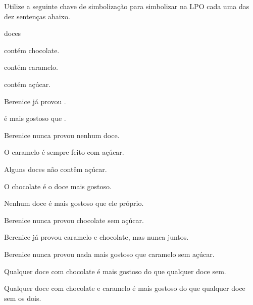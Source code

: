 \problempart
\label{pr.QLcandies}
Utilize a seguinte chave de simbolização para simbolizar na LPO cada uma das dez sentenças abaixo.
\begin{center}
\begin{ekey}
\item[\text{domínio}] doces
\item[\atom{C}{x}]  contém chocolate.
\item[\atom{M}{x}]  contém caramelo.
\item[\atom{A}{x}]  contém açúcar.
\item[\atom{B}{x}] Berenice já provou .
\item[\atom{G}{x,y}]  é mais gostoso que .
\end{ekey}
\end{center}
\begin{earg}
\item Berenice nunca provou nenhum doce.
\item O caramelo é sempre feito com açúcar.
\item Alguns doces não contêm açúcar.
\item O chocolate é o doce mais gostoso.
\item Nenhum doce é mais gostoso que ele próprio.
\item Berenice nunca provou chocolate sem açúcar.
\item Berenice já provou caramelo e chocolate, mas nunca juntos.
\item Berenice nunca provou nada mais gostoso que caramelo sem açúcar.
\item Qualquer doce com chocolate é mais gostoso do que qualquer doce sem.
\item Qualquer doce com chocolate e caramelo é mais gostoso do que qualquer doce sem os dois.
\end{earg}

